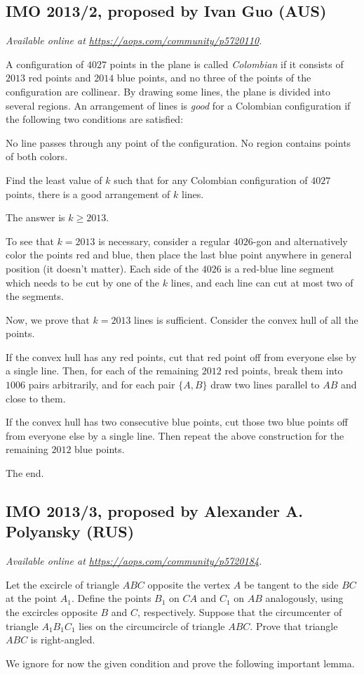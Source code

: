 \documentclass[11pt]{scrartcl}
\begin{document}
\subsection{IMO 2013/2, proposed by Ivan Guo (AUS)}
\textsl{Available online at \url{https://aops.com/community/p5720110}.}
\begin{mdframed}[style=mdpurplebox,frametitle={Problem statement}]
A configuration of $4027$ points in the plane is called
\emph{Colombian} if it consists of $2013$ red points and $2014$ blue points,
and no three of the points of the configuration are collinear.
By drawing some lines, the plane is divided into several regions.
An arrangement of lines is \emph{good} for a Colombian configuration
if the following two conditions are satisfied:
\begin{enumerate}
  \ii[(i)] No line passes through any point of the configuration.
  \ii[(ii)] No region contains points of both colors.
\end{enumerate}
Find the least value of $k$ such that for any Colombian configuration
of $4027$ points, there is a good arrangement of $k$ lines.
\end{mdframed}
The answer is $k \ge 2013$.

To see that $k = 2013$ is necessary,
consider a regular $4026$-gon and alternatively color the
points red and blue,
then place the last blue point anywhere
in general position (it doesn't matter).
Each side of the $4026$ is a red-blue line segment
which needs to be cut by one of the $k$ lines,
and each line can cut at most two of the segments.

Now, we prove that $k = 2013$ lines is sufficient.
Consider the convex hull of all the points.
\begin{itemize}
  \ii If the convex hull has any red points,
  cut that red point off from everyone else by a single line.
  Then, for each of the remaining $2012$ red points,
  break them into $1006$ pairs arbitrarily,
  and for each pair $\{A, B\}$ draw two lines
  parallel to $AB$ and close to them.

  \ii If the convex hull has two consecutive blue points,
  cut those two blue points off from everyone else by a single line.
  Then repeat the above construction
  for the remaining $2012$ blue points.
\end{itemize}
The end.
\pagebreak

\subsection{IMO 2013/3, proposed by Alexander A. Polyansky (RUS)}
\textsl{Available online at \url{https://aops.com/community/p5720184}.}
\begin{mdframed}[style=mdpurplebox,frametitle={Problem statement}]
Let the excircle of triangle $ABC$ opposite
the vertex $A$ be tangent to the side $BC$ at the point $A_1$.
Define the points $B_1$ on $CA$ and $C_1$ on $AB$ analogously,
using the excircles opposite $B$ and $C$, respectively.
Suppose that the circumcenter of triangle $A_1B_1C_1$ lies
on the circumcircle of triangle $ABC$.
Prove that triangle $ABC$ is right-angled.
\end{mdframed}
We ignore for now the given condition
and prove the following important lemma.
\end{document}
